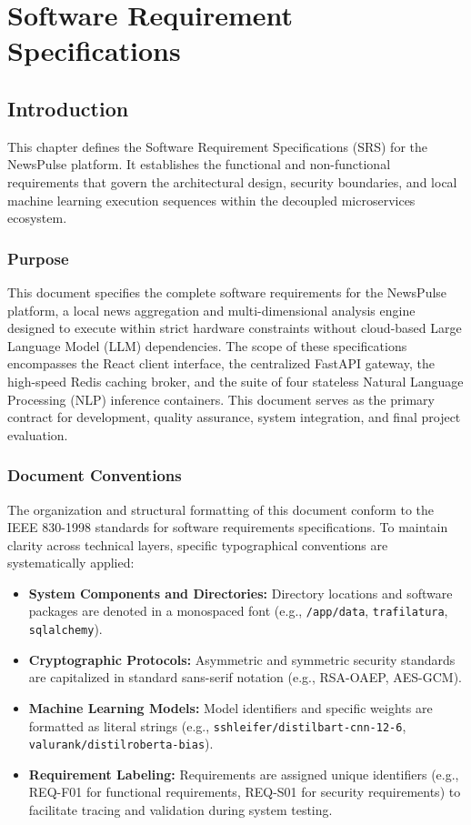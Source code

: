 \chapter{Software Requirement Specifications}
\label{ch:software-requirement-specifications}
\newpage

\section{Introduction}
This chapter defines the Software Requirement Specifications (SRS) for the NewsPulse platform. It establishes the functional and non-functional requirements that govern the architectural design, security boundaries, and local machine learning execution sequences within the decoupled microservices ecosystem.

\subsection{Purpose}
This document specifies the complete software requirements for the NewsPulse platform, a local news aggregation and multi-dimensional analysis engine designed to execute within strict hardware constraints without cloud-based Large Language Model (LLM) dependencies. The scope of these specifications encompasses the React client interface, the centralized FastAPI gateway, the high-speed Redis caching broker, and the suite of four stateless Natural Language Processing (NLP) inference containers. This document serves as the primary contract for development, quality assurance, system integration, and final project evaluation.

\subsection{Document Conventions}
The organization and structural formatting of this document conform to the IEEE 830-1998 standards for software requirements specifications. To maintain clarity across technical layers, specific typographical conventions are systematically applied:
\begin{itemize}
    \item \textbf{System Components and Directories:} Directory locations and software packages are denoted in a monospaced font (e.g., \texttt{/app/data}, \texttt{trafilatura}, \texttt{sqlalchemy}).
    \item \textbf{Cryptographic Protocols:} Asymmetric and symmetric security standards are capitalized in standard sans-serif notation (e.g., RSA-OAEP, AES-GCM).
    \item \textbf{Machine Learning Models:} Model identifiers and specific weights are formatted as literal strings (e.g., \texttt{sshleifer/\allowbreak{}distilbart-\allowbreak{}cnn-\allowbreak{}12-6}, \texttt{valurank/\allowbreak{}distilroberta-\allowbreak{}bias}).
    \item \textbf{Requirement Labeling:} Requirements are assigned unique identifiers (e.g., REQ-F01 for functional requirements, REQ-S01 for security requirements) to facilitate tracing and validation during system testing.
\end{itemize}

